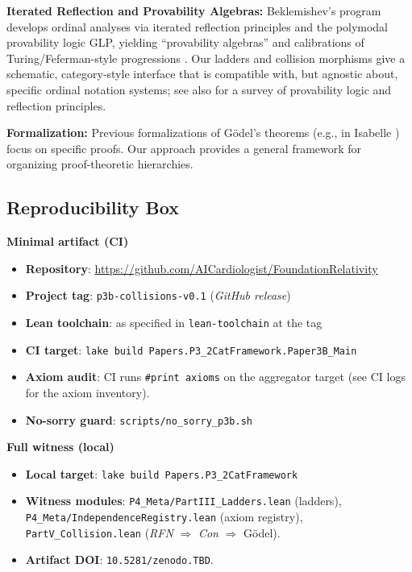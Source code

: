 \documentclass[11pt]{article}
\providecommand{\leanRepo}{\url{https://github.com/AICardiologist/FoundationRelativity}}
\providecommand{\pThreeBTag}{p3b-collisions-v0.1} %
\providecommand{\pThreeBDOI}{10.5281/zenodo.TBD}  %
\begin{document}
\textbf{Iterated Reflection and Provability Algebras:} Beklemishev’s program develops ordinal analyses via iterated reflection principles and the polymodal provability logic GLP, yielding “provability algebras” and calibrations of Turing/Feferman-style progressions \cite{Beklemishev2003,Beklemishev2004}. Our ladders and collision morphisms give a schematic, category‑style interface that is compatible with, but agnostic about, specific ordinal notation systems; see also \cite{ArtemovBeklemishev2004} for a survey of provability logic and reflection principles.

\textbf{Formalization:} Previous formalizations of Gödel's theorems (e.g., in Isabelle \cite{Paulson}) focus on specific proofs. Our approach provides a general framework for organizing proof-theoretic hierarchies.

\subsection{Reproducibility Box}

\begin{mdframed}[backgroundcolor=gray!10]
\textbf{Minimal artifact (CI)}
\begin{itemize}
  \item \textbf{Repository}: \leanRepo
  \item \textbf{Project tag}: \texttt{\pThreeBTag} (\emph{GitHub release})
  \item \textbf{Lean toolchain}: as specified in \texttt{lean-toolchain} at the tag
  \item \textbf{CI target}: \texttt{lake build Papers.P3\_2CatFramework.Paper3B\_Main}
  \item \textbf{Axiom audit}: CI runs \texttt{\#print axioms} on the aggregator target
        (see CI logs for the axiom inventory).
  \item \textbf{No-sorry guard}: \texttt{scripts/no\_sorry\_p3b.sh}
\end{itemize}

\textbf{Full witness (local)}
\begin{itemize}
  \item \textbf{Local target}: \texttt{lake build Papers.P3\_2CatFramework}
  \item \textbf{Witness modules}: 
    \texttt{P4\_Meta/PartIII\_Ladders.lean} (ladders),
    \texttt{P4\_Meta/IndependenceRegistry.lean} (axiom registry),
    \texttt{PartV\_Collision.lean} (\emph{RFN} $\Rightarrow$ \emph{Con} $\Rightarrow$ Gödel).
  \item \textbf{Artifact DOI}: \texttt{\pThreeBDOI}.
\end{itemize}
\end{mdframed}
\end{document}
